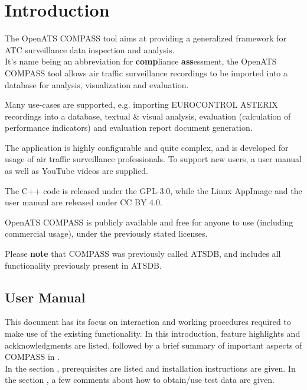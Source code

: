\chapter{Introduction}

The OpenATS COMPASS tool aims at providing a generalized framework for ATC surveillance data inspection and analysis. \\

It’s name being an abbreviation for \textbf{comp}liance \textbf{ass}essment, the OpenATS COMPASS tool allows air traffic surveillance recordings to be imported into a database for analysis, visualization and evaluation.

Many use-cases are supported, e.g. importing EUROCONTROL ASTERIX recordings into a database, textual \& visual analysis, evaluation (calculation of performance indicators) and evaluation report document generation.

The application is highly configurable and quite complex, and is developed for usage of air traffic surveillance professionals. To support new users, a user manual as well as YouTube videos are supplied.

The C++ code is released under the GPL-3.0, while the Linux AppImage and the user manual are released under CC BY 4.0.

OpenATS COMPASS is publicly available and free for anyone to use (including commercial usage), under the previously stated licenses.

Please \textbf{note} that COMPASS was previously called ATSDB, and includes all functionality previously present in ATSDB. \\

\section{User Manual}

This document has its focus on interaction and working procedures required to make use of the existing
functionality. In this introduction, feature highlights and ackknowledgments are listed, followed by a brief summary of important aspects of  COMPASS in . \\

In the section , prerequisites are listed and installation instructions are given. In the section , a few comments about how to obtain/use test data are given. \\

